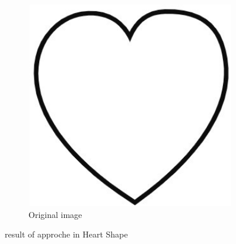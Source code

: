 \begin{figure}[H]
    \centering
    \begin{subfigure}[b]{1\textwidth}
        \centering
        \includegraphics[width=12cm,height=9cm]{chapiter3/figures/figure 12 a.jpeg}
        \caption{Original image}
    \end{subfigure}
    \caption{result of approche in Heart Shape}
    \label{fig:figure3.11}
\end{figure}

